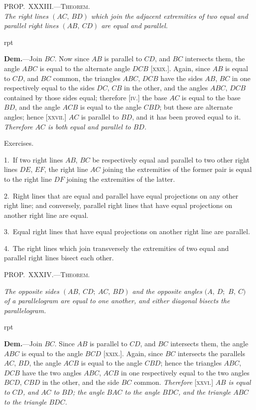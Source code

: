 \documentclass[oneside]{book}
\newcounter{wrapwidth}
\newcommand\myprop[2]{
\bigskip\Needspace*{4\baselineskip}\begin{center}\textsc{#1}\\\medskip\emph{#2}\par\end{center}
}
\newcommand\mypropl[2]{
\bigskip\Needspace*{4\baselineskip}\begin{center}\textsc{#1}\end{center}
\hspace{\parindent}\emph{#2}\par\medskip
}
\newcommand\exhead[1]{
\Needspace*{5\baselineskip}\begin{center}
\textsf{#1}
\end{center}
}
\newcommand\imgflow[3]{
\setcounter{wrapwidth}{#1}

\begin{wrapfigure}[#2]{r}{\value{wrapwidth}pt}
\begin{center}
\vspace{-0.3in}

\end{center}
\end{wrapfigure}
}
\begin{document}
\myprop{PROP\@.~XXXIII\@.---Theorem.}{The right lines $(AC,\ BD)$ which join the adjacent extremities
of two equal and parallel right lines $(AB,\ CD)$ are equal and parallel.}


\imgflow{133}{9}{f053}

\textbf{Dem.}---Join $BC$. Now since $AB$ is parallel to $CD$,
and $BC$ intersects them, the
angle $ABC$ is equal to the
alternate angle $DCB$ [\textsc{xxix.}].
Again, since $AB$ is equal to
$CD$, and $BC$ common, the triangles
$ABC$, $DCB$ have the
sides $AB$, $BC$ in one respectively
equal to the sides $DC$,
$CB$ in the other, and the angles $ABC$, $DCB$ contained
by those sides equal; therefore [\textsc{iv.}] the base $AC$ is
equal to the base $BD$, and the angle $ACB$ is equal to
the angle $CBD$; but these are alternate angles; hence
[\textsc{xxvii.}] $AC$ is parallel to $BD$, and it has been proved
equal to it. \emph{Therefore $AC$ is both equal and parallel to $BD$.}



\exhead{Exercises.}

\begin{footnotesize}
1.~If two right lines $AB$, $BC$ be respectively equal and parallel
to two other right lines $DE$, $EF$, the right line $AC$ joining the
extremities of the former pair is equal to the right line $DF$ joining
the extremities of the latter.

2.~Right lines that are equal and parallel have equal projections
on any other right line; and conversely, parallel right lines that
have equal projections on another right line are equal.

3.~Equal right lines that have equal projections on another
right line are parallel.

4.~The right lines which join transversely the extremities of
two equal and parallel right lines bisect each other.
\par\end{footnotesize}


\mypropl{PROP\@.~XXXIV\@.---Theorem.}{The opposite sides $(AB,\ CD;\ AC,\ BD)$ and the opposite
angles $(A,\ D;$ $B,\ C)$ of a parallelogram are equal to
one another, and either diagonal bisects the parallelogram.}


\imgflow{133}{8}{f054}

\textbf{Dem.}---Join $BC$. Since $AB$ is parallel to $CD$, and
$BC$ intersects them, the angle
$ABC$ is equal to the angle
$BCD$ [\textsc{xxix.}]. Again, since
$BC$ intersects the parallels $AC$,
$BD$, the angle $ACB$ is equal to
the angle $CBD$; hence the triangles
$ABC$, $DCB$ have the two
angles $ABC$, $ACB$ in one respectively
equal to the two angles $BCD$, $CBD$ in the other,
and the side $BC$ common. \emph{Therefore} [\textsc{xxvi.}] \emph{$AB$ is equal
to $CD$, and $AC$ to $BD$; the angle $BAC$ to the angle $BDC$,
and the triangle $ABC$ to the triangle $BDC$.}
\end{document}
